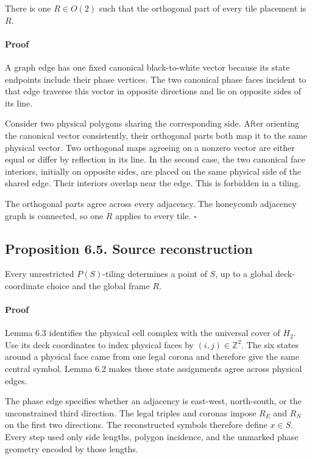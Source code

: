 \documentclass[11pt]{article}
\begin{document}
There is one \(R\in O(2)\) such that the orthogonal part of every tile
placement is \(R\).

\paragraph{Proof}

A graph edge has one fixed canonical black-to-white vector because its state
endpoints include their phase vertices. The two canonical phase faces
incident to that edge traverse this vector in opposite directions and lie on
opposite sides of its line.

Consider two physical polygons sharing the corresponding side. After
orienting the canonical vector consistently, their orthogonal parts both map
it to the same physical vector. Two orthogonal maps agreeing on a nonzero
vector are either equal or differ by reflection in its line. In the second
case, the two canonical face interiors, initially on opposite sides, are
placed on the same physical side of the shared edge. Their interiors overlap
near the edge. This is forbidden in a tiling.

The orthogonal parts agree across every adjacency. The honeycomb adjacency
graph is connected, so one \(R\) applies to every tile. \(\square\)

\subsection*{Proposition 6.5. Source reconstruction}

Every unrestricted \(P(S)\)-tiling determines a point of \(S\), up to a
global deck-coordinate choice and the global frame \(R\).

\paragraph{Proof}

Lemma 6.3 identifies the physical cell complex with the universal cover of
\(H_2\). Use its deck coordinates to index physical faces by
\((i,j)\in\mathbb Z^2\). The six states around a physical face came from one
legal corona and therefore give the same central symbol. Lemma 6.2 makes
these state assignments agree across physical edges.

The phase edge specifies whether an adjacency is east-west, north-south, or
the unconstrained third direction. The legal triples and coronas impose
\(R_E\) and \(R_N\) on the first two directions. The reconstructed symbols
therefore define \(x\in S\). Every step used only side lengths, polygon
incidence, and the unmarked phase geometry encoded by those lengths.
\end{document}
